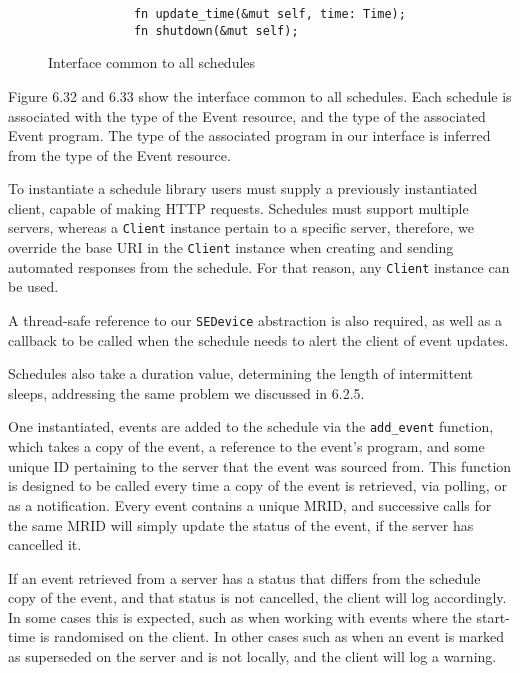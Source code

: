 \begin{figure}[h]
    \begin{center}
        \begin{lstlisting}
            fn update_time(&mut self, time: Time);
            fn shutdown(&mut self);
        \end{lstlisting}
        \label{fig:schedulerimpl}
        \vspace{-10pt}
        \caption{Interface common to all schedules}
    \end{center}
\end{figure}

Figure 6.32 and 6.33 show the interface common to all schedules. Each schedule is associated with the type of the Event resource, and the type of the associated Event program. The type of the associated program in our interface is inferred from the type of the Event resource.

To instantiate a schedule library users must supply a previously instantiated client, capable of making HTTP requests. Schedules must support multiple servers, whereas a \texttt{Client} instance pertain to a specific server, therefore, we override the base URI in the \texttt{Client} instance when creating and sending automated responses from the schedule. For that reason, any \texttt{Client} instance can be used.

A thread-safe reference to our \texttt{SEDevice} abstraction is also required, as well as a callback to be called when the schedule needs to alert the client of event updates.

Schedules also take a duration value, determining the length of intermittent sleeps, addressing the same problem we discussed in 6.2.5.

One instantiated, events are added to the schedule via the \texttt{add\_event} function, which takes a copy of the event, a reference to the event's program, and some unique ID pertaining to the server that the event was sourced from. This function is designed to be called every time a copy of the event is retrieved, via polling, or as a notification. Every event contains a unique MRID, and successive calls for the same MRID will simply update the status of the event, if the server has cancelled it. 

If an event retrieved from a server has a status that differs from the schedule copy of the event, and that status is not cancelled, the client will log accordingly. In some cases this is expected, such as when working with events where the start-time is randomised on the client. In other cases such as when an event is marked as superseded on the server and is not locally, and the client will log a warning.


